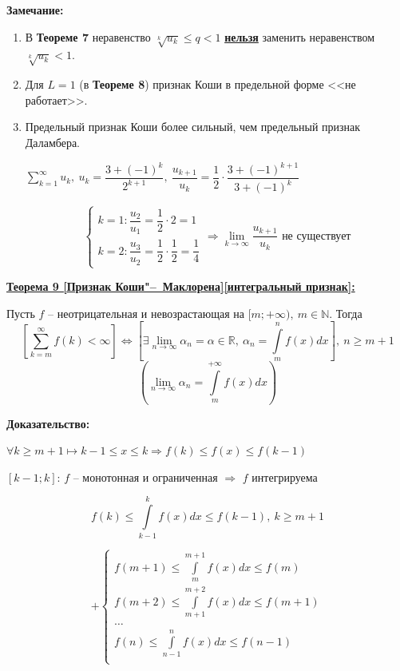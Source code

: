 \documentclass[a4paper,12pt]{article} %
\newcommand{\R}{\mathbb{R}}
\newcommand{\N}{\mathbb{N}}
\newcommand{\useries}{\sum\limits_{k=1}^{\infty} u_k}
\begin{document}
\textbf{Замечание:}
\begin{enumerate}
	\item В \textbf{Теореме 7} неравенство $\sqrt[k]{u_k} \leqslant q < 1$ \underline{\textbf{нельзя}} заменить неравенством $\sqrt[k]{u_k} < 1$.
	\item Для $L = 1$ (в \textbf{Теореме 8}) признак Коши в предельной форме <<не работает>>.
	\item Предельный признак Коши более сильный, чем предельный признак Даламбера.
	
	$\useries, \ u_k = \dfrac{3 + (-1)^k}{2^{k+1}}, \ \dfrac{u_{k+1}}{u_k} = \dfrac{1}{2} \cdot \dfrac{3 + (-1)^{k+1}}{3 + (-1)^k}$
	
	\begin{equation*}
		\begin{cases}
			k = 1: \dfrac{u_2}{u_1} = \dfrac{1}{2} \cdot 2 = 1 \\
			k = 2: \dfrac{u_3}{u_2} = \dfrac{1}{2} \cdot \dfrac{1}{2} = \dfrac{1}{4} 
		\end{cases}
	\Rightarrow \lim\limits_{k \to \infty} \dfrac{u_{k+1}}{u_k} \text{ не существует}
	\end{equation*}
\end{enumerate}

\underline{\textbf{Теорема 9 [Признак Коши"--~Маклорена][интегральный признак]:}}

Пусть $f$ -- неотрицательная и невозрастающая на $[m; +\infty), \ m \in \N$. Тогда
\[ \left[ \sum\limits_{k=m}^{\infty} f(k) < \infty \right] \Leftrightarrow \left[ \exists \lim\limits_{n \to \infty} \alpha_n = \alpha \in \R, \ \alpha_n = \int\limits_{m}^{n}f(x)dx \right],  \ n \geqslant m + 1 \]
\[\left(\lim\limits_{n \to \infty} \alpha_n = \int\limits_{m}^{+\infty} f(x) dx \right)\]

\textbf{Доказательство:}

$\forall k \geqslant m + 1 \mapsto k-1 \leqslant x \leqslant k \Rightarrow f(k) \leqslant f(x) \leqslant f(k-1)$

$[k-1; k]$: $f$ -- монотонная и ограниченная $\Rightarrow$ $f$ интегрируема

\[f(k) \leqslant \int\limits_{k-1}^{k} f(x)dx \leqslant f(k-1), \ k \geqslant m+1\]

\begin{equation*}
	+
	\begin{cases}
		f(m+1) \leqslant \int\limits_{m}^{m+1} f(x)dx \leqslant f(m)\\
		f(m+2) \leqslant \int\limits_{m+1}^{m+2} f(x)dx \leqslant f(m+1)\\
		\dots\\
		f(n) \leqslant \int\limits_{n-1}^{n} f(x)dx \leqslant f(n-1)\\
	\end{cases}
\end{equation*}
\end{document}
